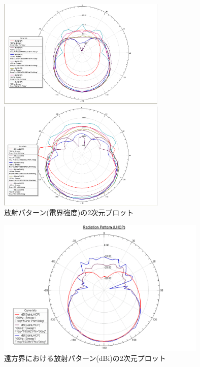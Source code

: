 \documentclass[11pt,a4paper,uplatex]{ujarticle}
\begin{document}
  \clearpage
  \begin{figure}[tbp]
    \centering
    \begin{minipage}[b]{0.5\textwidth}
      \centering
      \includegraphics[keepaspectratio, width=80mm]{Images/rad_pattern_far.png}
    \end{minipage}
    \begin{minipage}[b]{0.5\textwidth}
      \centering
      \includegraphics[keepaspectratio, width=80mm]{Images/rad_pattern_near.png}
    \end{minipage}
    \caption{放射パターン(電界強度)の2次元プロット}\label{fig:radiation_pattern_2D}
  \end{figure}
  \begin{figure}[hbtp]
    \centering
    \includegraphics[keepaspectratio, width=100mm]{Images/radiation_pattern_lhcp.png}
    \caption{遠方界における放射パターン(dBi)の2次元プロット}
    \label{fig:radiation_pattern_lhcp}
  \end{figure}
  \clearpage
\end{document}
